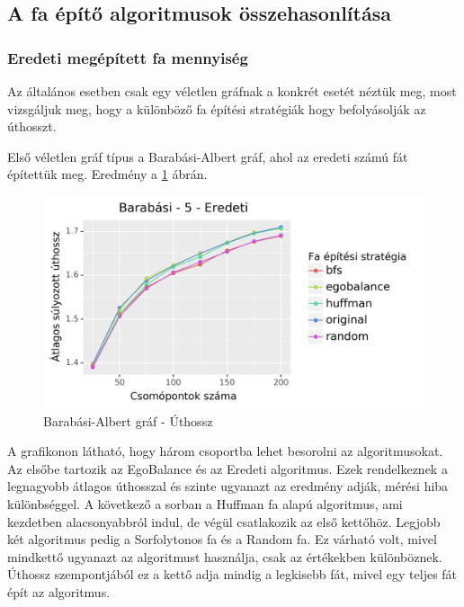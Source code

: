 \documentclass[12pt]{report}
\begin{document}
\subsection{A fa építő algoritmusok összehasonlítása}

\subsubsection{Eredeti megépített fa mennyiség}

Az általános esetben csak egy véletlen gráfnak a konkrét esetét néztük meg, most vizsgáljuk meg, hogy a különböző fa építési stratégiák hogy befolyásolják az úthosszt.

Első véletlen gráf típus a Barabási-Albert gráf, ahol az eredeti számú fát építettük meg. 
Eredmény a \ref{barabasi-len} ábrán.

\begin{figure}[H]
	\begin{center}
		\includegraphics[width=0.9\linewidth]{pictures/barabasi_len_e.png}
		\caption{Barabási-Albert gráf - Úthossz}
		\label{barabasi-len}
	\end{center}
\end{figure}

A grafikonon látható, hogy három csoportba lehet besorolni az algoritmusokat. 
Az elsőbe tartozik az EgoBalance és az Eredeti algoritmus.
Ezek rendelkeznek a legnagyobb átlagos úthosszal és szinte ugyanazt az eredmény adják, mérési hiba különbséggel.
A következő a sorban a Huffman fa alapú algoritmus, ami kezdetben alacsonyabbról indul, de végül csatlakozik az első kettőhöz.
Legjobb két algoritmus pedig a Sorfolytonos fa és a Random fa.
Ez várható volt, mivel mindkettő ugyanazt az algoritmust használja, csak az értékekben különböznek.
Úthossz szempontjából ez a kettő adja mindig a legkisebb fát, mivel egy teljes fát épít az algoritmus.
\end{document}
